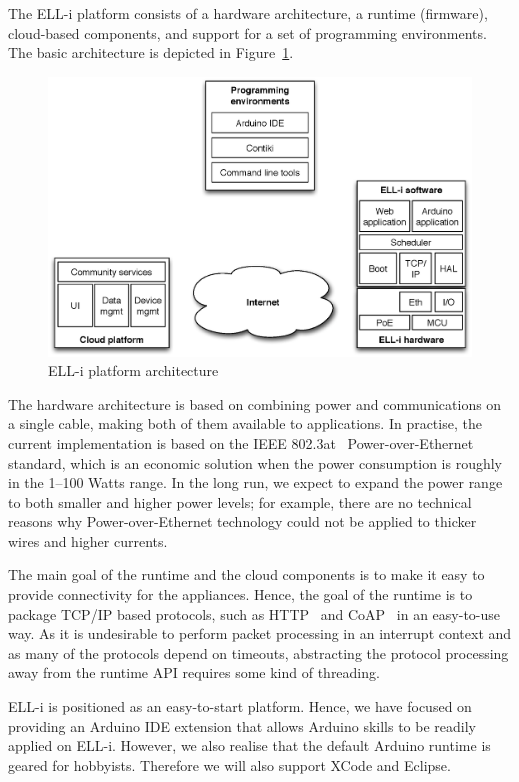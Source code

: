 \documentclass[final]{siamltex}
\begin{document}
The ELL-i platform consists of a hardware architecture, a runtime
(firmware), cloud-based components, and support for a set of
programming environments.  The basic architecture is depicted in
Figure~\ref{fig:arch}.

\begin{figure}
\centering
\includegraphics[scale=.55]{figures/arch.eps}
\caption{ELL-i platform architecture}
\label{fig:arch}
\end{figure}

The hardware architecture is based on combining power and
communications on a single cable, making both of them available to
applications.  In practise, the current implementation is based on the
IEEE 802.3at~\cite{802.3at} Power-over-Ethernet standard, which is an economic
solution when the power consumption is roughly in the 1--100 Watts
range. In the long run, we expect to expand the power range to both
smaller and higher power levels; for example, there are no technical
reasons why Power-over-Ethernet technology could not be applied to thicker wires
and higher currents.

The main goal of the runtime and the cloud components is to make it easy
to provide connectivity for the appliances.  Hence, the goal of the
runtime is to package TCP/IP based protocols, such as HTTP~\cite{fielding1999hypertext}
and CoAP~\cite{shelby2013constrained} in an easy-to-use way.  As it is undesirable to
perform packet processing in an interrupt context and as many of the
protocols depend on timeouts, abstracting the protocol processing away
from the runtime API requires some kind of threading.

ELL-i is positioned as an easy-to-start platform.
Hence, we have focused on providing an Arduino IDE
extension that allows Arduino skills to be readily applied on ELL-i.
However, we also realise that the default Arduino runtime is geared
for hobbyists.  Therefore we will also support XCode and Eclipse.
\end{document}

